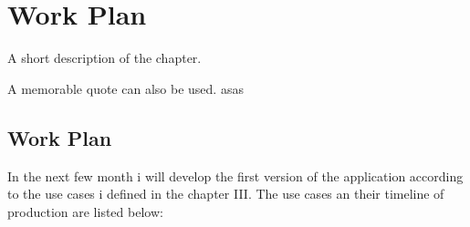\chapter{Work Plan}%
\label{chapter:workPlan}

\begin{introduction}
A short description of the chapter.

A memorable quote can also be used. asas
\end{introduction} 


\section{Work Plan}

In the next few month i will develop the first version of the application according to the use cases i defined in the chapter III. 
The use cases an their timeline of production are listed below:  

